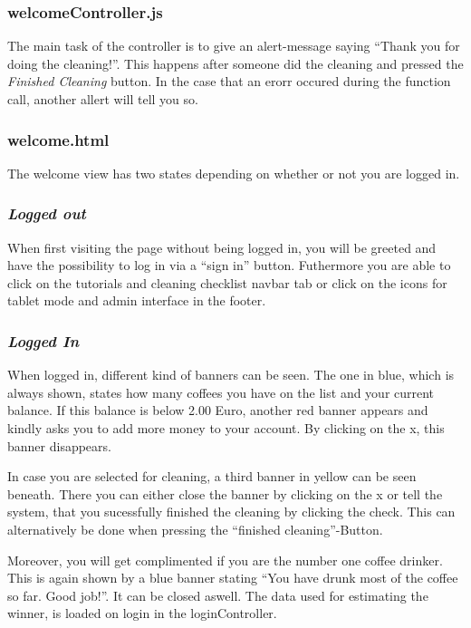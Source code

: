 \subsubsection*{welcomeController.js}

The main task of the controller is to give an alert-message saying
``Thank you for doing the cleaning!''. This happens after someone did
the cleaning and pressed the \emph{Finished Cleaning} button. In the
case that an erorr occured during the function call, another allert will
tell you so.

\subsubsection*{welcome.html}

The welcome view has two states depending on whether or not you are
logged in.

\subsubsection*{\emph{Logged out}}

When first visiting the page without being logged in, you will be
greeted and have the possibility to log in via a ``sign in'' button.
Futhermore you are able to click on the tutorials and cleaning checklist
navbar tab or click on the icons for tablet mode and admin interface in
the footer.

\subsubsection*{\emph{Logged In}}

When logged in, different kind of banners can be seen. The one in blue,
which is always shown, states how many coffees you have on the list and
your current balance. If this balance is below 2.00 Euro, another red
banner appears and kindly asks you to add more money to your account. By
clicking on the x, this banner disappears.

In case you are selected for cleaning, a third banner in yellow can be
seen beneath. There you can either close the banner by clicking on the x
or tell the system, that you sucessfully finished the cleaning by
clicking the check. This can alternatively be done when pressing the
``finished cleaning''-Button.

Moreover, you will get complimented if you are the number one coffee
drinker. This is again shown by a blue banner stating ``You have drunk
most of the coffee so far. Good job!''. It can be closed aswell. The
data used for estimating the winner, is loaded on login in the
loginController.

